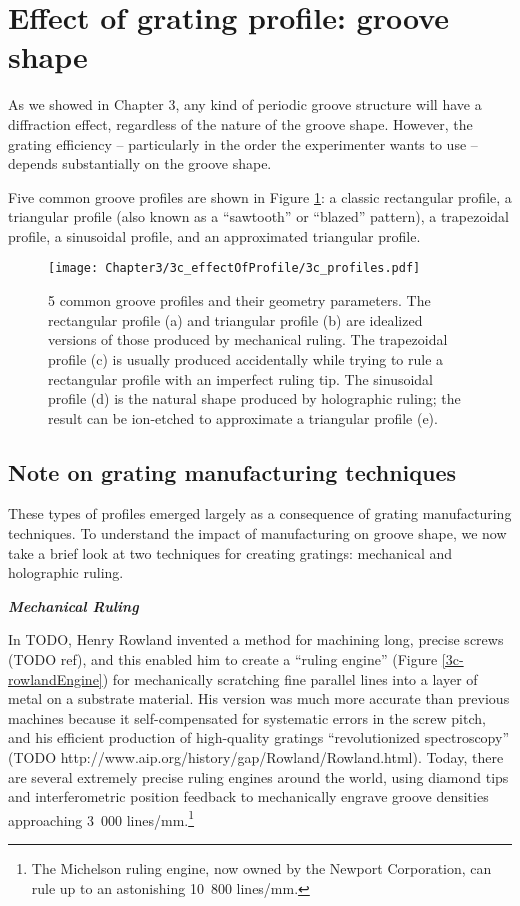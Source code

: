 \section{Effect of grating profile: groove shape}

As we showed in Chapter 3, any kind of periodic groove structure will have a diffraction effect, regardless of the nature of the groove shape.  However, the grating efficiency -- particularly in the order the experimenter wants to use -- depends substantially on the groove shape.  

Five common groove profiles are shown in Figure \ref{3c-profile}: a classic rectangular profile, a triangular profile (also known as a ``sawtooth'' or ``blazed'' pattern), a trapezoidal profile, a sinusoidal profile, and an approximated triangular profile.

\begin{figure}[htbp] %
   \centering
   \texttt{[image: Chapter3/3c\_effectOfProfile/3c\_profiles.pdf]}
   \caption[5 common groove profiles and their geometry parameters.]{5 common groove profiles and their geometry parameters.  The rectangular profile (a) and triangular profile (b) are idealized versions of those produced by mechanical ruling.  The trapezoidal profile (c) is usually produced accidentally while trying to rule a rectangular profile with an imperfect ruling tip.  The sinusoidal profile (d) is the natural shape produced by holographic ruling; the result can be ion-etched to approximate a triangular profile (e).}
   \label{3c-profile}
\end{figure}

\subsection{Note on grating manufacturing techniques}
\label{gratingManufacturing}
These types of profiles emerged largely as a consequence of grating manufacturing techniques.  To understand the impact of manufacturing on groove shape, we now take a brief look at two techniques for creating gratings: mechanical and holographic ruling.

\noindent \textbf{\emph{Mechanical Ruling}}

\noindent In TODO, Henry Rowland invented a method for machining long, precise screws (TODO ref), and this enabled him to create a ``ruling engine'' (Figure \ref{3c-rowlandEngine}) for mechanically scratching fine parallel lines into a layer of metal on a substrate material.  His version was much more accurate than previous machines because it self-compensated for systematic errors in the screw pitch, and his efficient production of high-quality gratings ``revolutionized spectroscopy'' (TODO http://www.aip.org/history/gap/Rowland/Rowland.html).  Today, there are several extremely precise ruling engines around the world, using diamond tips and interferometric position feedback to mechanically engrave groove densities approaching 3~000 lines/mm.\footnote{The Michelson ruling engine, now owned by the Newport Corporation, can rule up to an astonishing 10~800 lines/mm.}

